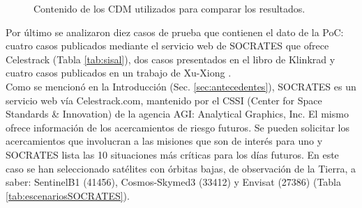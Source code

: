  \begin{figure}[H]
  \centering
  \caption{Contenido de los CDM utilizados para comparar los resultados.}
  \label{fig:cdmsproc}
\end{figure}

Por \'ultimo se analizaron diez casos de prueba que contienen el dato de la PoC: cuatro casos publicados mediante el servicio web de SOCRATES \citep{Kelso} que ofrece Celestrack (Tabla \ref{tab:sisal}),  dos casos  presentados en el libro de Klinkrad \citep{KlinkradChapter8} y cuatro casos publicados en un trabajo de Xu-Xiong \citep{xu2014method}.\\

Como se mencion\'o en la Introducci\'on (Sec. \ref{sec:antecedentes}), SOCRATES es un 
servicio web v\'ia Celestrack.com, mantenido por el CSSI (Center for Space Standards \& Innovation) de la agencia AGI: Analytical Graphics, Inc. El mismo ofrece informaci\'on de los acercamientos de riesgo futuros. Se pueden solicitar los acercamientos que involucran a las misiones que son de inter\'es para uno y SOCRATES lista las 10 situaciones m\'as cr\'iticas para los d\'ias futuros. En este caso se han seleccionado sat\'elites con \'orbitas bajas, de observaci\'on de la Tierra, a saber: SentinelB1 (41456), Cosmos-Skymed3 (33412) y Envisat (27386) (Tabla \ref{tab:escenariosSOCRATES}).

\begin{table}[!h]
 \caption{Casos de Prueba tomados del servicio SOCRATES (Celestrack.com).}
\label{tab:escenariosSOCRATES}
\end{table}

